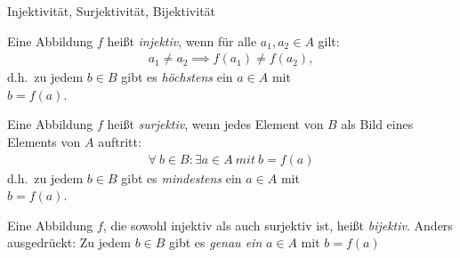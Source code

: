 \begin{karte}{Injektivität, Surjektivität, Bijektivität}
	{\large
		Eine Abbildung \(f\) heißt \emph{injektiv}, wenn für alle \(a_1,a_2 \in A\) gilt:
		\begin{align}
			a_1 \neq a_2 \implies f(a_1) \neq f(a_2),
		\end{align}
		d.h.\ zu jedem $b\in B$ gibt es \emph{höchstens} ein $a\in A$ mit\\ $b=f(a)$.

		Eine Abbildung \(f\) heißt \emph{surjektiv}, wenn jedes Element von \(B\)  als Bild eines Elements von $A$ auftritt:
		\begin{align}
			\forall \ b \in B: \exists a\in A \ mit \ b=f(a)
		\end{align}
		d.h.\ zu jedem \(b\in B\) gibt es \emph{mindestens} ein \(a\in A\) mit\\ \(b=f(a)\).

		Eine Abbildung \(f\), die sowohl injektiv als auch surjektiv ist, heißt \emph{bijektiv}. Anders ausgedrückt: Zu jedem \(b \in B\) gibt es \emph{genau ein} \(a \in A\) mit \(b=f(a)\)
	}
\end{karte}
